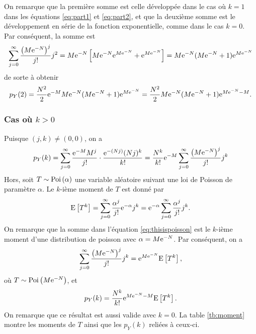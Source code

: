 \documentclass[11pt]{article}
\newcommand\Esp[1]{%
	\ensuremath{%
		\mathrm{E}\left[#1\right]%
	}%
}%
\newcommand\Poi[1]{%
	\ensuremath{%
		\mathrm{Poi}\left(#1\right)%
	}%
}%
\newcommand\e{%
    \ensuremath{%
        \mathrm{e}%
    }%
}
\begin{document}
On remarque que la première somme est celle développée dans le cas où $k=1$
dans les équations \eqref{eq:part1} et \eqref{eq:part2}, et que la deuxième somme
est le développement en série de la fonction exponentielle, comme dans le cas
$k=0$. Par conséquent, la somme est
\begin{equation*}
    \sum_{j=0}^\infty\frac{\left(M\e^{-N}\right)^j}{j!}j^2
    =M\e^{-N}\left[M\e^{-N}\e^{M\e^{-N}}+\e^{M\e^{-N}}\right]
    =M\e^{-N}(M\e^{-N}+1)\e^{M\e^{-N}}
\end{equation*}
de sorte à obtenir
\begin{equation*}
    p_Y(2)
    =\frac{N^2}{2}\e^{-M}M\e^{-N}(M\e^{-N}+1)\e^{M\e^{-N}}
    =\frac{N^2}{2}M\e^{-N}(M\e^{-N}+1)\e^{M\e^{-N}-M}.
\end{equation*}

\subsubsection*{Cas où \boldmath $k>0$}
Puisque $(j,k)\neq (0,0)$, on a
\begin{equation}\label{eq:thisispoisson}
    p_Y(k)
    =\sum_{j=0}^\infty\frac{\e^{-M}M^j}{j!}\cdot\frac{\e^{-(Nj)}(Nj)^k}{k!}
    =\frac{N^k}{k!}\e^{-M}\sum_{j=0}^\infty\frac{\left(M\e^{-N}\right)^j}{j!}j^k
\end{equation}
Hors, soit $T\sim\Poi{\alpha}$ une variable aléatoire suivant une loi de Poisson
de paramètre $\alpha$. Le $k$-ième moment de $T$ est donné par
\begin{equation*}
    \Esp{T^k}
    =\sum_{j=0}^\infty\frac{\alpha^j}{j!}\e^{-\alpha}j^k
    =\e^{-\alpha}\sum_{j=0}^\infty\frac{\alpha^j}{j!}j^k.
\end{equation*}
On remarque que la somme dans l'équation \eqref{eq:thisispoisson} est le
$k$-ième moment d'une distribution de poisson avec $\alpha=M\e^{-N}$. Par
conséquent, on a
\begin{equation*}
    \sum_{j=0}^\infty\frac{\left(M\e^{-N}\right)^j}{j!}j^k
    =\e^{M\e^{-N}}\Esp{T^k},
\end{equation*}
où $T\sim\Poi{M\e^{-N}}$, et
\begin{equation*}
    p_Y(k)
    =\frac{N^k}{k!}\e^{M\e^{-N}-M}\Esp{T^k}.
\end{equation*}
On remarque que ce résultat est aussi valide avec $k=0$. La table \ref{tb:moment}
montre les moments de $T$ ainsi que les $p_Y(k)$ reliées à ceux-ci.
\end{document}
